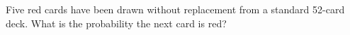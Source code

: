 Five red cards have been drawn without replacement from a standard 52-card deck. What is the probability the next card is red?
